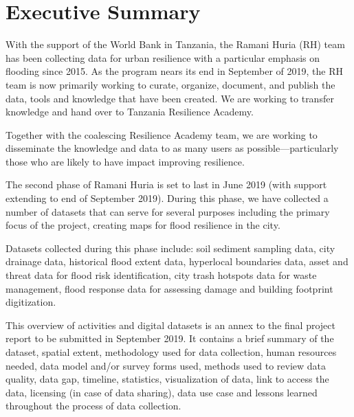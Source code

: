 \documentclass[a4paper,12pt,twoside]{article}
\begin{document}
\newpage

\renewcommand{\baselinestretch}{0.6}\normalsize
\tableofcontents
\renewcommand{\baselinestretch}{1.0}\normalsize

\newpage
\section{Executive Summary}
\label{executivesummary}
\begin{multicols}{2}

With the support of the World Bank in Tanzania, the Ramani Huria (RH) team has been collecting data for urban resilience with a particular emphasis on flooding since 2015. As the program nears its end in September of 2019, the RH team is now primarily working to curate, organize, document, and publish the data, tools and knowledge that have been created. We are working to transfer knowledge and hand over to Tanzania Resilience Academy.

Together with the coalescing Resilience Academy team, we are working to disseminate the knowledge and data to as many users as possible---particularly those who are likely to have impact improving resilience.

The second phase of Ramani Huria is set to last in June 2019 (with support extending to end of September 2019). During this phase, we have collected a number of datasets that can serve for several purposes including the primary focus of the project, creating maps for flood resilience in the city. 

Datasets collected during this phase include: soil sediment sampling data, city drainage data, historical flood extent data, hyperlocal boundaries data, asset and threat data for flood risk identification, city trash hotspots data for waste management, flood response data for assessing damage and building footprint digitization.

This overview of activities and digital datasets is an annex to the final project report to be submitted in September 2019. It contains a brief summary of the dataset, spatial extent, methodology used for data collection, human resources needed, data model and/or survey forms used, methods used to review data quality, data gap, timeline, statistics, visualization of data, link to access the data, licensing (in case of data sharing), data use case and lessons learned throughout the process of data collection.


\end{multicols}
\end{document}
